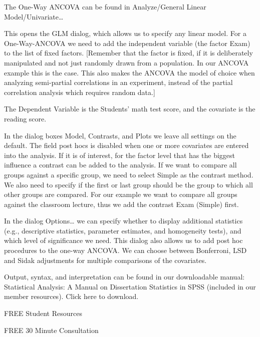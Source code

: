 The One-Way ANCOVA can be found in Analyze/General Linear Model/Univariate…





This opens the GLM dialog, which allows us to specify any linear model.  For a One-Way-ANCOVA we need to add the independent variable (the factor Exam) to the list of fixed factors.  [Remember that the factor is fixed, if it is deliberately manipulated and not just randomly drawn from a population.  In our ANCOVA example this is the case.  This also makes the ANCOVA the model of choice when analyzing semi-partial correlations in an experiment, instead of the partial correlation analysis which requires random data.]

The Dependent Variable is the Students' math test score, and the covariate is the reading score.

In the dialog boxes Model, Contrasts, and Plots we leave all settings on the default.  The field post hocs is disabled when one or more covariates are entered into the analysis.  If it is of interest, for the factor level that has the biggest influence a contrast can be added to the analysis.  If we want to compare all groups against a specific group, we need to select Simple as the contrast method.  We also need to specify if the first or last group should be the group to which all other groups are compared.  For our example we want to compare all groups against the classroom lecture, thus we add the contrast Exam (Simple) first.



In the dialog Options… we can specify whether to display additional statistics (e.g., descriptive statistics, parameter estimates, and homogeneity tests), and which level of significance we need.  This dialog also allows us to add post hoc procedures to the one-way ANCOVA.  We can choose between Bonferroni, LSD and Sidak adjustments for multiple comparisons of the covariates.

Output, syntax, and interpretation can be found in our downloadable manual: Statistical Analysis: A Manual on Dissertation Statistics in SPSS (included in our member resources).  Click here to download.

 

FREE Student Resources

FREE 30 Minute Consultation
